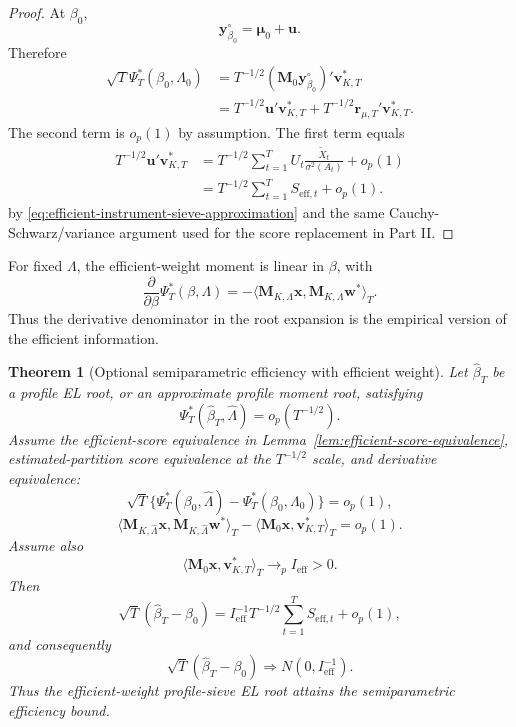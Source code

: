 \documentclass[12pt]{article}
\numberwithin{equation}{section}
\newtheorem{theorem}{Theorem}
\theoremstyle{definition}
\newcommand{\op}{o_p}
\newcommand{\innerT}[2]{\langle #1,#2\rangle_T}
\begin{document}
\begin{proof}
At \(\beta_0\),
\[
    \bm y_{\beta_0}^\circ=\bm\mu_0+\bm u.
\]
Therefore
\[
\begin{aligned}
    \sqrt T\Psi_T^*(\beta_0,\Lambda_0)
    &=T^{-1/2}(\bm M_0\bm y_{\beta_0}^\circ)'\bm v_{K,T}^* \\
    &=T^{-1/2}\bm u'\bm v_{K,T}^*
      +T^{-1/2}\bm r_{\mu,T}'\bm v_{K,T}^*.
\end{aligned}
\]
The second term is \(\op(1)\) by assumption. The first term equals
\[
\begin{aligned}
    T^{-1/2}\bm u'\bm v_{K,T}^*
    &=T^{-1/2}\sum_{t=1}^T U_t
      \frac{\widetilde X_t}{\sigma^2(A_t)}+\op(1) \\
    &=T^{-1/2}\sum_{t=1}^T S_{\mathrm{eff},t}+\op(1).
\end{aligned}
\]
by \eqref{eq:efficient-instrument-sieve-approximation} and the same
Cauchy-Schwarz/variance argument used for the score replacement in Part II.
\end{proof}

For fixed \(\Lambda\), the efficient-weight moment is linear in \(\beta\), with
\[
    \frac{\partial}{\partial\beta}\Psi_T^*(\beta,\Lambda)
    =-\innerT{\bm M_{K,\Lambda}\bm x}{\bm M_{K,\Lambda}\bm w^*}.
\]
Thus the derivative denominator in the root expansion is the empirical version
of the efficient information.

\begin{theorem}[Optional semiparametric efficiency with efficient weight]
\label{thm:semiparametric-efficiency}
Let \(\widehat\beta_T\) be a profile EL root, or an approximate profile moment
root, satisfying
\[
    \Psi_T^*(\widehat\beta_T,\widehat\Lambda)=\op(T^{-1/2}).
\]
Assume the efficient-score equivalence in
Lemma~\ref{lem:efficient-score-equivalence}, estimated-partition score
equivalence at the \(T^{-1/2}\) scale, and derivative equivalence:
\[
    \sqrt T\{\Psi_T^*(\beta_0,\widehat\Lambda)
      -\Psi_T^*(\beta_0,\Lambda_0)\}=\op(1),
\]
\[
    \innerT{\bm M_{K,\widehat\Lambda}\bm x}
            {\bm M_{K,\widehat\Lambda}\bm w^*}
    -\innerT{\bm M_0\bm x}{\bm v_{K,T}^*}=\op(1).
\]
Assume also
\[
    \innerT{\bm M_0\bm x}{\bm v_{K,T}^*}\to_p I_{\mathrm{eff}}>0.
\]
Then
\[
    \sqrt T(\widehat\beta_T-\beta_0)
    =I_{\mathrm{eff}}^{-1}T^{-1/2}\sum_{t=1}^T S_{\mathrm{eff},t}+\op(1),
\]
and consequently
\[
    \sqrt T(\widehat\beta_T-\beta_0)
    \Rightarrow N(0,I_{\mathrm{eff}}^{-1}).
\]
Thus the efficient-weight profile-sieve EL root attains the semiparametric
efficiency bound.
\end{theorem}
\end{document}
